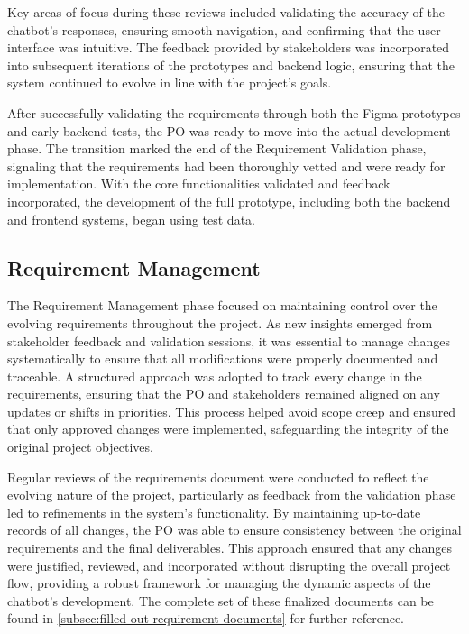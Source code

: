 Key areas of focus during these reviews included validating the accuracy of the chatbot’s responses, ensuring smooth
navigation, and confirming that the user interface was intuitive. The feedback provided by stakeholders was incorporated
into subsequent iterations of the prototypes and backend logic, ensuring that the system continued to evolve in line
with the project’s goals.

After successfully validating the requirements through both the Figma prototypes and early backend tests, the \acs{PO}
was ready to move into the actual development phase. The transition marked the end of the Requirement Validation phase,
signaling that the requirements had been thoroughly vetted and were ready for implementation. With the core
functionalities validated and feedback incorporated, the development of the full prototype, including both the backend
and frontend systems, began using test data.

\subsection{Requirement Management}\label{subsec:requirement-management}

The Requirement Management phase focused on maintaining control over the evolving requirements throughout the project.
As new insights emerged from stakeholder feedback and validation sessions, it was essential to manage changes
systematically to ensure that all modifications were properly documented and traceable. A structured approach was
adopted to track every change in the requirements, ensuring that the \acs{PO} and stakeholders remained aligned on any
updates or shifts in priorities. This process helped avoid scope creep and ensured that only approved changes were
implemented, safeguarding the integrity of the original project objectives.

Regular reviews of the requirements document were conducted to reflect the evolving nature of the project, particularly
as feedback from the validation phase led to refinements in the system’s functionality. By maintaining up-to-date
records of all changes, the \acs{PO} was able to ensure consistency between the original requirements and the final
deliverables. This approach ensured that any changes were justified, reviewed, and incorporated without disrupting the
overall project flow, providing a robust framework for managing the dynamic aspects of the chatbot’s development. The
complete set of these finalized documents can be found in \ref{subsec:filled-out-requirement-documents} for further
reference.
